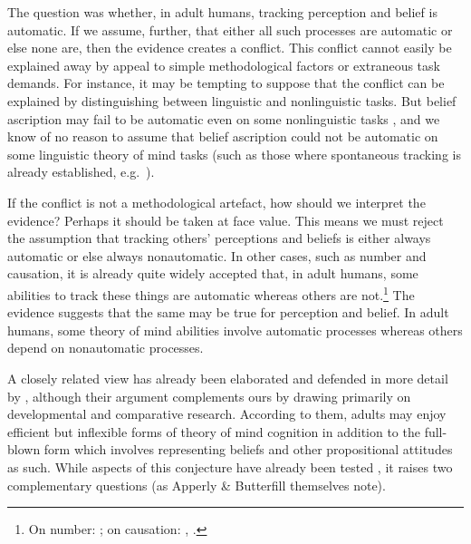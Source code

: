 \documentclass[12pt,\papersize]{extarticle}
\begin{document}
The question was whether, in adult humans,  tracking perception and belief is automatic.  
If we assume, further, that either all such processes are automatic or else none are, then the evidence creates a conflict.
This conflict  cannot easily be explained away by appeal to simple methodological factors or extraneous task demands.
For instance, it may be tempting to suppose that the conflict can be explained by distinguishing between linguistic and nonlinguistic tasks.  
But belief ascription may fail to be automatic even on some nonlinguistic tasks \citep[e.g.][]{apperly:2004_frontal}, and we know of no reason to assume that belief ascription could not be automatic on some linguistic theory of mind tasks (such as those where spontaneous tracking is already established, e.g.\ \citet{ferguson_listeners_2012}).

If the conflict is not a methodological artefact, how should we interpret the evidence?
Perhaps it should be taken at face value.
This means we must reject the assumption that tracking others' perceptions and beliefs is either always automatic or else always nonautomatic.
In other cases, such as number and causation, it is already quite widely accepted that, in adult humans, some abilities to track these things are automatic whereas others are not.\footnote{
On number: \citet{trick:1994_small};
on causation: \citet{Michotte:1946nz}, \citet{Scholl:2004dx}.
}
The evidence suggests that the same may be true for perception and belief.
In adult humans, some theory of mind abilities involve automatic processes whereas others depend on nonautomatic processes. 

A closely related view has already been elaborated and defended in more detail by
\citet[]{Apperly:2009ju},
although their argument complements ours by drawing  primarily on developmental and comparative research. 
According to them,
adults may enjoy efficient but inflexible forms of theory of mind cognition in addition to the full-blown form which involves representing beliefs and other propositional attitudes as such.
While aspects of this conjecture have already been tested \citep[]{Samson:2010jm, en_2397, surtees_direct_2011}, it raises two complementary questions (as Apperly \& Butterfill themselves note).  
\end{document}
